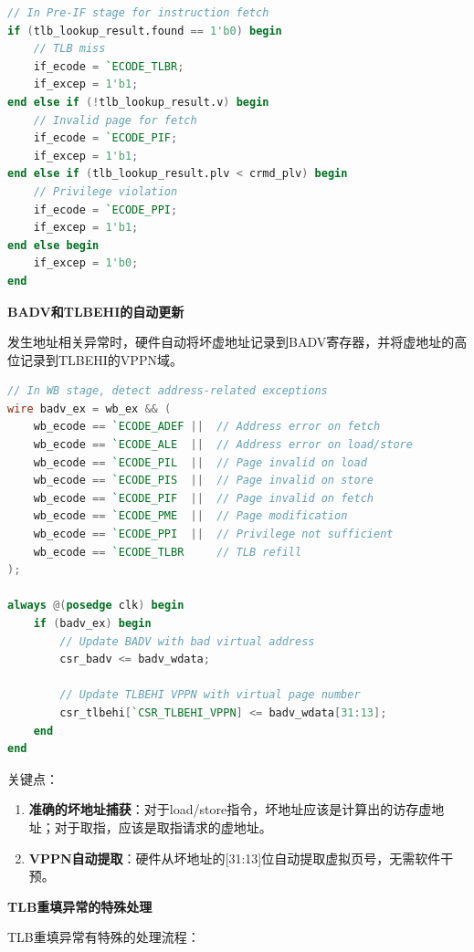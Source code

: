 \begin{lstlisting}[language=Verilog, caption=IF级取指异常检测]
// In Pre-IF stage for instruction fetch
if (tlb_lookup_result.found == 1'b0) begin
    // TLB miss
    if_ecode = `ECODE_TLBR;
    if_excep = 1'b1;
end else if (!tlb_lookup_result.v) begin
    // Invalid page for fetch
    if_ecode = `ECODE_PIF;
    if_excep = 1'b1;
end else if (tlb_lookup_result.plv < crmd_plv) begin
    // Privilege violation
    if_ecode = `ECODE_PPI;
    if_excep = 1'b1;
end else begin
    if_excep = 1'b0;
end
\end{lstlisting}

\textbf{BADV和TLBEHI的自动更新}

发生地址相关异常时，硬件自动将坏虚地址记录到BADV寄存器，并将虚地址的高位记录到TLBEHI的VPPN域。

\begin{lstlisting}[language=Verilog, caption=BADV和TLBEHI的异常更新]
// In WB stage, detect address-related exceptions
wire badv_ex = wb_ex && (
    wb_ecode == `ECODE_ADEF ||  // Address error on fetch
    wb_ecode == `ECODE_ALE  ||  // Address error on load/store
    wb_ecode == `ECODE_PIL  ||  // Page invalid on load
    wb_ecode == `ECODE_PIS  ||  // Page invalid on store
    wb_ecode == `ECODE_PIF  ||  // Page invalid on fetch
    wb_ecode == `ECODE_PME  ||  // Page modification
    wb_ecode == `ECODE_PPI  ||  // Privilege not sufficient
    wb_ecode == `ECODE_TLBR     // TLB refill
);

always @(posedge clk) begin
    if (badv_ex) begin
        // Update BADV with bad virtual address
        csr_badv <= badv_wdata;
        
        // Update TLBEHI VPPN with virtual page number
        csr_tlbehi[`CSR_TLBEHI_VPPN] <= badv_wdata[31:13];
    end
end
\end{lstlisting}

关键点：

\begin{enumerate}
    \item \textbf{准确的坏地址捕获}：对于load/store指令，坏地址应该是计算出的访存虚地址；对于取指，应该是取指请求的虚地址。

    \item \textbf{VPPN自动提取}：硬件从坏地址的[31:13]位自动提取虚拟页号，无需软件干预。
\end{enumerate}

\textbf{TLB重填异常的特殊处理}

TLB重填异常有特殊的处理流程：

